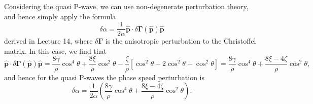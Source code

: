 \documentclass[a4paper,10pt]{paper}
\begin{document}
\begin{enumerate}
 Considering the quasi P-wave, we can use non-degenerate perturbation theory, and hence simply apply the formula
\begin{equation*}
    \delta\alpha=\frac{1}{2\alpha}\hat{\mathbf{p}}\cdot\delta\boldsymbol{\Gamma}(\hat{\mathbf{p}})\hat{\mathbf{p}}
\end{equation*}
derived in Lecture 14, where $\delta\boldsymbol{\Gamma}$ is the anisotropic perturbation to the Christoffel matrix. In this case, we find that
\begin{equation*}
    \hat{\mathbf{p}}\cdot\delta\boldsymbol{\Gamma}(\hat{\mathbf{p}})\hat{\mathbf{p}}=\frac{8\gamma}{\rho}\cos^{4}\theta+\frac{8\xi}{\rho}\cos^{2}\theta-\frac{\zeta}{\rho}[\cos^{2}\theta+2\cos^{2}\theta+\cos^{2}\theta] = \frac{8\gamma}{\rho}\cos^{4}\theta+\frac{8\xi-4\zeta}{\rho}\cos^{2}\theta,
\end{equation*}
and hence for the quasi P-waves the phase speed perturbation is
\begin{equation*}
    \delta\alpha=\frac{1}{2\alpha}\left(\frac{8\gamma}{\rho}\cos^{4}\theta+\frac{8\xi-4\zeta}{\rho}\cos^{2}\theta\right).
\end{equation*}


\end{enumerate}
\end{document}
